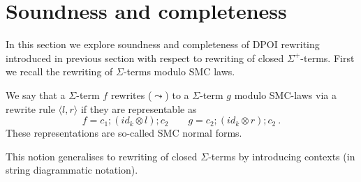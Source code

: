 \section{Soundness and completeness}

In this section we explore soundness and completeness of DPOI rewriting introduced in previous section with respect to rewriting of closed $\Sigma^{+}$-terms.
First we recall the rewriting of $\Sigma$-terms modulo SMC laws.

\begin{definition}
    We say that a $\Sigma$-term $f$ rewrites ($\leadsto$) to a $\Sigma$-term $g$ modulo SMC-laws via a rewrite rule $\langle l, r \rangle$ if they are representable as
    \[
    f = c_{1};(id_{k} \otimes l);c_{2} \qquad g = c_{2};(id_{k} \otimes r);c_{2}~.
    \]
    These representations are so-called SMC normal forms.
\end{definition}

This notion generalises to rewriting of closed $\Sigma$-terms by introducing contexts (in string diagrammatic notation).
